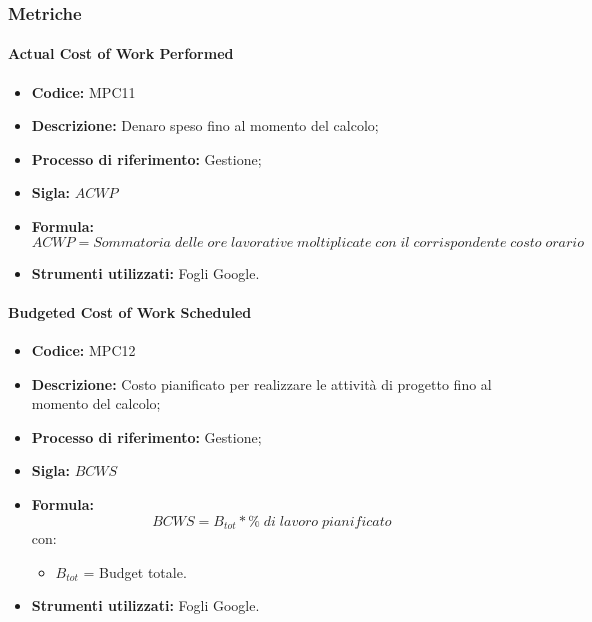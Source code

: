 \subsubsection{Metriche}

\paragraph{Actual Cost of Work Performed}
\begin{itemize}
	\item \textbf{Codice:} MPC11
	\item \textbf{Descrizione:} Denaro speso fino al momento del calcolo;
	\item \textbf{Processo di riferimento:} Gestione;
	\item \textbf{Sigla:} $ACWP$
	\item \textbf{Formula:} $$ACWP = {Sommatoria\; delle\; ore\; lavorative\; moltiplicate\; con\; il\; corrispondente\; costo\; orario}$$
	\item \textbf{Strumenti utilizzati:} Fogli Google.
\end{itemize}

\paragraph{Budgeted Cost of Work Scheduled}
\begin{itemize}
	\item \textbf{Codice:} MPC12
	\item \textbf{Descrizione:} Costo pianificato per realizzare le attività di progetto fino al momento del calcolo;
	\item \textbf{Processo di riferimento:} Gestione;
	\item \textbf{Sigla:} $BCWS$
	\item \textbf{Formula:} $$BCWS = {B_{tot} * \% \;di\; lavoro\; pianificato}$$
	con:
	\begin{itemize}
		\item $B_{tot}$ = Budget totale.
	\end{itemize}
	\item \textbf{Strumenti utilizzati:} Fogli Google.
\end{itemize}

